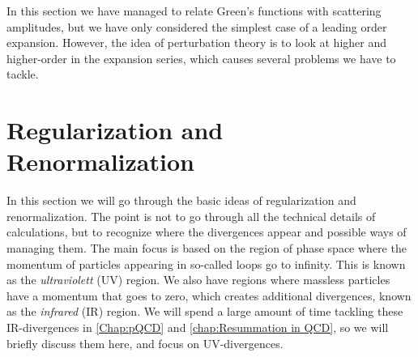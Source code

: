 In this section we have managed to relate Green's functions with scattering amplitudes, but we have only considered the simplest case of a leading order expansion. However, the idea of perturbation theory is to look at higher and higher-order in the expansion series, which causes several problems we have to tackle. 




















\section{Regularization and Renormalization}\label{sec:Renormalization}
In this section we will go through the basic ideas of regularization and renormalization. The point is not to go through all the technical details of calculations, but to recognize where the divergences appear and possible ways of managing them. The main focus is based on the region of phase space where the momentum of particles appearing in so-called loops go to infinity. This is known as the \emph{ultraviolett} (UV) region. We also have regions where massless particles have a momentum that goes to zero, which creates additional divergences, known as the \emph{infrared} (IR) region. We will spend a large amount of time tackling these IR-divergences in \cref{Chap:pQCD} and \cref{chap:Resummation in QCD}, so we will briefly discuss them here, and focus on UV-divergences.

